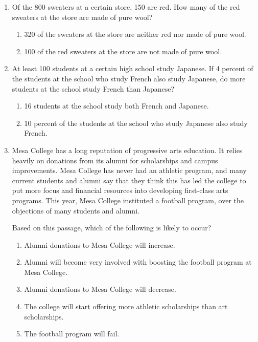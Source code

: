 \documentclass[12pt]{article}
\begin{document}
\begin{enumerate}[label=\textbf{\arabic*.}, start=1]
\item  Of the 800 sweaters at a certain store, 150 are red. How many of the red sweaters at the store are made of pure wool?

\begin{enumerate}[label=(\arabic*)]
    \item 320 of the sweaters at the store are neither red nor made of pure wool.
    \item 100 of the red sweaters at the store are not made of pure wool.
\end{enumerate}

\item At least 100 students at a certain high school study Japanese. If 4 percent of the students at the school who study French also study Japanese, do more students at the school study French than Japanese?

\begin{enumerate}[label=(\arabic*)]
    \item 16 students at the school study both French and Japanese.
    \item 10 percent of the students at the school who study Japanese also study French.

\end{enumerate}

\item Mesa College has a long reputation of progressive arts education. It relies heavily on donations from its alumni for scholarships and campus improvements. Mesa College has never had an athletic program, and many current students and alumni say that they think this has led the college to put more focus and financial resources into developing first-class arts programs. This year, Mesa College instituted a football program, over the objections of many students and alumni.

\noindent Based on this passage, which of the following is likely to occur?


\begin{enumerate}[label=(\Alph*)]
    \item Alumni donations to Mesa College will increase.
    \item Alumni will become very involved with boosting the football program at Mesa College.
    \item Alumni donations to Mesa College will decrease.
    \item The college will start offering more athletic scholarships than art scholarships.
    \item The football program will fail.
\end{enumerate}



\end{enumerate}
\end{document}
